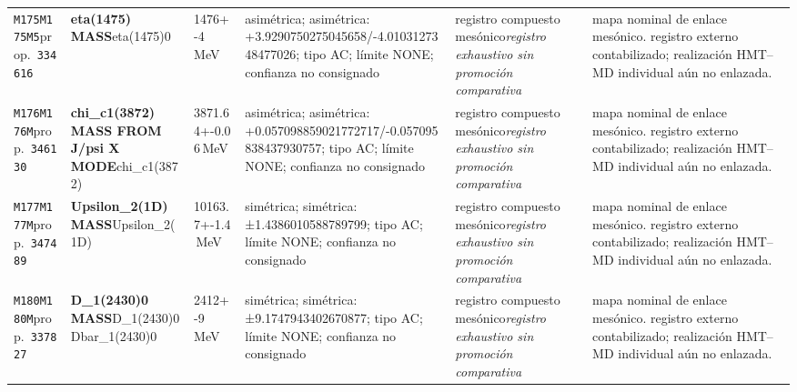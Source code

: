 \begin{landscape}
\begin{longtable}{L{1.85cm}L{4.45cm}L{2.35cm}L{4.05cm}L{3.35cm}L{7.15cm}}
\texttt{M175}\newline \texttt{M175M5}\newline prop.\ \texttt{334616} & \textbf{eta(1475) MASS}\newline eta(1475)0 & 1476+-4\,MeV & asimétrica; asimétrica: +3.9290750275045658/-4.0103127348477026; tipo AC; límite NONE; confianza no consignado & registro compuesto mesónico\newline \emph{registro exhaustivo sin promoción comparativa} & mapa nominal de enlace mesónico. registro externo contabilizado; realización HMT--MD individual aún no enlazada. \\
\texttt{M176}\newline \texttt{M176M}\newline prop.\ \texttt{346130} & \textbf{chi\_\allowbreak{}c1(3872) MASS FROM J/psi X MODE}\newline chi\_\allowbreak{}c1(3872) & 3871.64+-0.06\,MeV & asimétrica; asimétrica: +0.057098859021772717/-0.057095838437930757; tipo AC; límite NONE; confianza no consignado & registro compuesto mesónico\newline \emph{registro exhaustivo sin promoción comparativa} & mapa nominal de enlace mesónico. registro externo contabilizado; realización HMT--MD individual aún no enlazada. \\
\texttt{M177}\newline \texttt{M177M}\newline prop.\ \texttt{347489} & \textbf{Upsilon\_\allowbreak{}2(1D) MASS}\newline Upsilon\_\allowbreak{}2(1D) & 10163.7+-1.4\,MeV & simétrica; simétrica: ±1.4386010588789799; tipo AC; límite NONE; confianza no consignado & registro compuesto mesónico\newline \emph{registro exhaustivo sin promoción comparativa} & mapa nominal de enlace mesónico. registro externo contabilizado; realización HMT--MD individual aún no enlazada. \\
\texttt{M180}\newline \texttt{M180M}\newline prop.\ \texttt{337827} & \textbf{D\_\allowbreak{}1(2430)0 MASS}\newline D\_\allowbreak{}1(2430)0 \textbar{}\allowbreak{} Dbar\_\allowbreak{}1(2430)0 & 2412+-9\,MeV & simétrica; simétrica: ±9.1747943402670877; tipo AC; límite NONE; confianza no consignado & registro compuesto mesónico\newline \emph{registro exhaustivo sin promoción comparativa} & mapa nominal de enlace mesónico. registro externo contabilizado; realización HMT--MD individual aún no enlazada. \\

\end{longtable}
\end{landscape}
